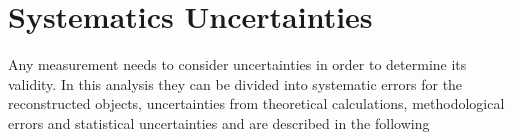 


\chapter{Systematics Uncertainties}
Any measurement needs to consider uncertainties in order to determine its validity. In this analysis they can be divided into systematic errors for the reconstructed objects, uncertainties from theoretical calculations, methodological errors and statistical uncertainties and are described in the following

